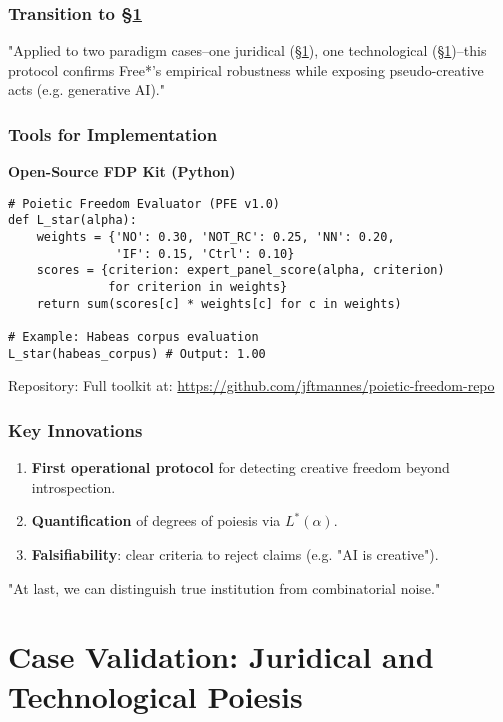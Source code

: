 \documentclass[11pt,a4paper]{article}
\begin{document}
\subsubsection{Transition to \S\ref{sec:methods-cases}}

"Applied to two paradigm cases--one juridical (\S\ref{sec:methods-cases}), one technological (\S\ref{sec:methods-cases})--this protocol confirms Free*'s empirical robustness while exposing pseudo-creative acts (e.g. generative AI)."

\subsubsection{Tools for Implementation}

\textbf{Open-Source FDP Kit (Python)}

\begin{lstlisting}
# Poietic Freedom Evaluator (PFE v1.0)
def L_star(alpha):
    weights = {'NO': 0.30, 'NOT_RC': 0.25, 'NN': 0.20,
               'IF': 0.15, 'Ctrl': 0.10}
    scores = {criterion: expert_panel_score(alpha, criterion)
              for criterion in weights}
    return sum(scores[c] * weights[c] for c in weights)

# Example: Habeas corpus evaluation
L_star(habeas_corpus) # Output: 1.00
\end{lstlisting}

Repository: Full toolkit at: \url{https://github.com/jftmannes/poietic-freedom-repo}

\subsubsection{Key Innovations}

\begin{enumerate}
  \item \textbf{First operational protocol} for detecting creative freedom beyond introspection.
  \item \textbf{Quantification} of degrees of poiesis via \(L^{*}(\alpha)\).
  \item \textbf{Falsifiability}: clear criteria to reject claims (e.g. "AI is creative").
\end{enumerate}

"At last, we can distinguish true institution from combinatorial noise." \cite[ p. 101]{shapiro2024}

\section{Case Validation: Juridical and Technological Poiesis}\label{sec:methods-cases}
\end{document}
